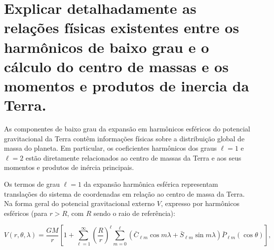 


\section{Explicar detalhadamente as relações físicas existentes entre os harmônicos de baixo grau e o cálculo do centro de massas e os momentos e produtos de inercia da Terra.}

As componentes de baixo grau da expansão em harmônicos esféricos do potencial gravitacional da Terra contêm informações físicas sobre a distribuição global de massa do planeta. Em particular, os coeficientes harmônicos dos graus \( \ell = 1 \) e \( \ell = 2 \) estão diretamente relacionados ao centro de massas da Terra e aos seus momentos e produtos de inércia principais. 

Os termos de grau \( \ell = 1 \) da expansão harmônica esférica representam translações do sistema de coordenadas em relação ao centro de massa da Terra. Na forma geral do potencial gravitacional externo \( V \), expresso por harmônicos esféricos (para \( r > R \), com \( R \) sendo o raio de referência):

\[
V(r, \theta, \lambda) = \frac{GM}{r} \left[ 1 + \sum_{\ell=1}^{\infty} \left( \frac{R}{r} \right)^\ell \sum_{m=0}^{\ell} \left( \bar{C}_{\ell m} \cos m\lambda + \bar{S}_{\ell m} \sin m\lambda \right) \bar{P}_{\ell m}(\cos \theta) \right] \text{,}
\]


